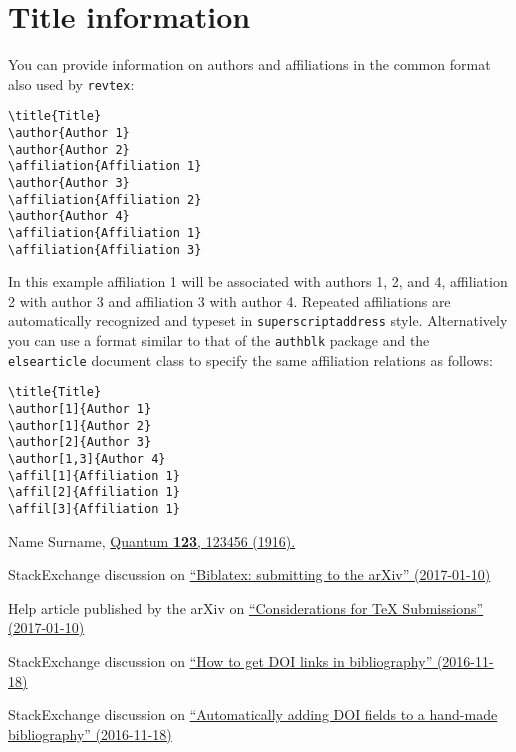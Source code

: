 \documentclass[a4paper,twocolumn,superscriptaddress,11pt,accepted=2017-05-09]{quantumarticle}
\begin{document}
\section{Title information}
You can provide information on authors and affiliations in the common format also used by \texttt{revtex}:
\begin{verbatim}
\title{Title}
\author{Author 1}
\author{Author 2}
\affiliation{Affiliation 1}
\author{Author 3}
\affiliation{Affiliation 2}
\author{Author 4}
\affiliation{Affiliation 1}
\affiliation{Affiliation 3}
\end{verbatim}
In this example affiliation 1 will be associated with authors 1, 2, and 4, affiliation 2 with author 3 and affiliation 3 with author 4.
Repeated affiliations are automatically recognized and typeset in \texttt{superscriptaddress} style.
Alternatively you can use a format similar to that of the \texttt{authblk} package and the \texttt{elsearticle} document class to specify the same affiliation relations as follows:
\begin{verbatim}
\title{Title}
\author[1]{Author 1}
\author[1]{Author 2}
\author[2]{Author 3}
\author[1,3]{Author 4}
\affil[1]{Affiliation 1}
\affil[2]{Affiliation 1}
\affil[3]{Affiliation 1}
\end{verbatim}


\begin{thebibliography}{9}
  Name Surname,
  \href{https://doi.org/10.22331/
        idonotexist}{Quantum
        \textbf{123}, 123456 (1916).}

  StackExchange discussion on \href{http://tex.stackexchange.com/questions/26990/biblatex-submitting-to-the-arxiv}{``Biblatex: submitting to the arXiv'' (2017-01-10)}

  Help article published by the arXiv on \href{https://arxiv.org/help/submit_tex}{``Considerations for TeX Submissions'' (2017-01-10)}

  StackExchange discussion on \href{http://tex.stackexchange.com/questions/3802/how-to-get-doi-links-in-bibliography}{``How to get DOI links in bibliography'' (2016-11-18)}
  
  StackExchange discussion on \href{http://tex.stackexchange.com/questions/6810/automatically-adding-doi-fields-to-a-hand-made-bibliography}{``Automatically adding DOI fields to a hand-made bibliography'' (2016-11-18)}
\end{thebibliography}
\end{document}
